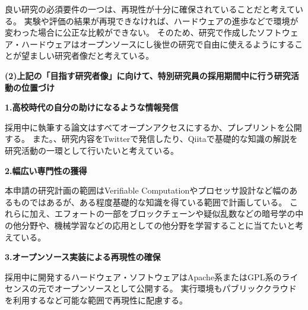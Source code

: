 良い研究の必須要件の一つは、再現性が十分に確保されていることだと考えている。
実験や評価の結果が再現できなければ、ハードウェアの進歩などで環境が変わった場合に公正な比較ができない。
そのため、研究で作成したソフトウェア・ハードウェアはオープンソースにし後世の研究で自由に使えるようにすることが望ましい研究者像だと考えている。



\vspace{5mm}
\noindent
\textbf{(2)上記の「目指す研究者像」に向けて、特別研究員の採用期間中に行う研究活動の位置づけ}

\noindent\textbf{1.高校時代の自分の助けになるような情報発信}

採用中に執筆する論文はすべてオープンアクセスにするか、プレプリントを公開する。
また。、研究内容をTwitterで発信したり、Qiitaで基礎的な知識の解説を研究活動の一環として行いたいと考えている。

\noindent\textbf{2.幅広い専門性の獲得}

本申請の研究計画の範囲はVerifiable Computationやプロセッサ設計など幅のあるものではあるが、ある程度基礎的な知識を得ている範囲で計画している。
これらに加え、エフォートの一部をブロックチェーンや疑似乱数などの暗号学の中の他分野や、機械学習などの応用としての他分野を学習することに当てたいと考えている。

\noindent\textbf{3.オープンソース実装による再現性の確保}

採用中に開発するハードウェア・ソフトウェアはApache系またはGPL系のライセンスの元でオープンソースとして公開する。
実行環境もパブリッククラウドを利用するなど可能な範囲で再現性に配慮する。







